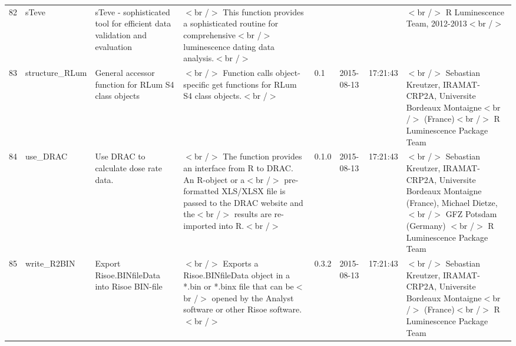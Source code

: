 \begin{table}[ht]
\begin{tabular}{rlllllll}
  82 & sTeve & sTeve - sophisticated tool for efficient data validation and evaluation & $<$br /$>$ This function provides a sophisticated routine for comprehensive$<$br /$>$ luminescence dating data analysis.$<$br /$>$ &  &  &  & $<$br /$>$ R Luminescence Team, 2012-2013$<$br /$>$ \\ 
  83 & structure\_RLum & General accessor function for RLum S4 class objects & $<$br /$>$ Function calls object-specific get functions for RLum S4 class objects.$<$br /$>$ & 0.1 & 2015-08-13 & 17:21:43
 & $<$br /$>$ Sebastian Kreutzer, IRAMAT-CRP2A, Universite Bordeaux Montaigne$<$br /$>$ (France)$<$br /$>$  R Luminescence Package Team \\ 
  84 & use\_DRAC & Use DRAC to calculate dose rate data. & $<$br /$>$ The function provides an interface from R to DRAC. An R-object or a$<$br /$>$ pre-formatted XLS/XLSX file is passed to the DRAC website and the$<$br /$>$ results are re-imported into R.$<$br /$>$ & 0.1.0 & 2015-08-13 & 17:21:43
 & $<$br /$>$ Sebastian Kreutzer, IRAMAT-CRP2A, Universite Bordeaux Montaigne (France), Michael Dietze,$<$br /$>$ GFZ Potsdam (Germany) $<$br /$>$  R Luminescence Package Team \\ 
  85 & write\_R2BIN & Export Risoe.BINfileData into Risoe BIN-file & $<$br /$>$ Exports a Risoe.BINfileData object in a *.bin or *.binx file that can be$<$br /$>$ opened by the Analyst software or other Risoe software.$<$br /$>$ & 0.3.2 & 2015-08-13 & 17:21:43
 & $<$br /$>$ Sebastian Kreutzer, IRAMAT-CRP2A, Universite Bordeaux Montaigne$<$br /$>$ (France)$<$br /$>$  R Luminescence Package Team \\ 
   \hline
\end{tabular}
\end{table}

